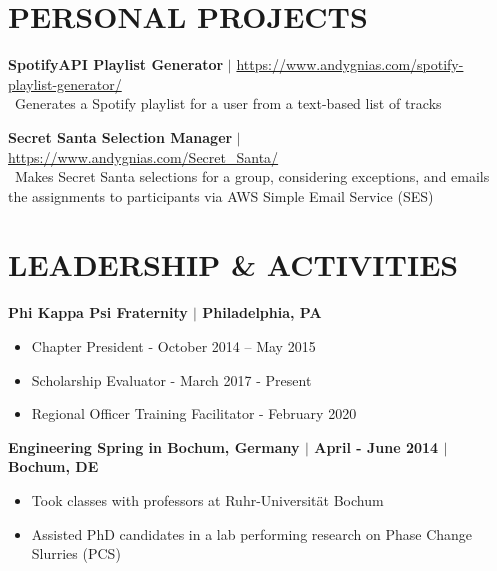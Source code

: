 \documentclass[line,resmargin,11pt]{res}
\begin{document}
\begin{resume}
\section{PERSONAL PROJECTS}

\textbf{SpotifyAPI Playlist Generator} $|$ \url{https://www.andygnias.com/spotify-playlist-generator/} \\
\textbullet\ Generates a Spotify playlist for a user from a text-based list of tracks

\textbf{Secret Santa Selection Manager} $|$ \url{https://www.andygnias.com/Secret_Santa/} \\
\textbullet\ Makes Secret Santa selections for a group, considering exceptions, and emails the assignments to participants via AWS Simple Email Service (SES)

				
\section{LEADERSHIP \& ACTIVITIES}
				\textbf{Phi Kappa Psi Fraternity $|$ Philadelphia, PA} \\
				\begin{itemize} \itemsep -2pt
				\item  Chapter President - October 2014 – May 2015
				\item Scholarship Evaluator - March 2017 - Present
				\item  Regional Officer Training Facilitator - February 2020
				\end{itemize}
				
				\textbf{Engineering Spring in Bochum, Germany  $|$ April - June 2014 $|$ Bochum, DE} \\
				\begin{itemize} \itemsep -2pt
				\item  Took classes with professors at Ruhr-Universität Bochum
				\item Assisted PhD candidates in a lab performing research on Phase Change Slurries (PCS)
				\end{itemize}

\end{resume}
\end{document}

